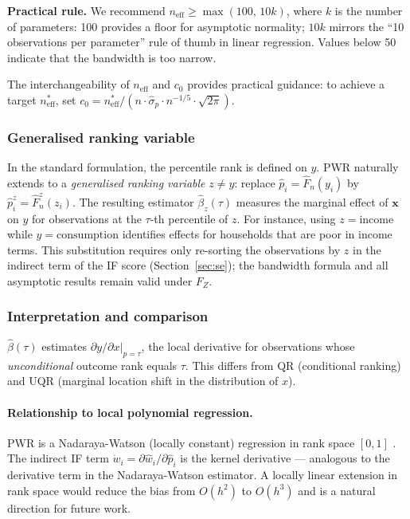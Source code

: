 \documentclass[12pt,a4paper]{article}
\theoremstyle{definition}
\newcommand{\bx}{\mathbf{x}}
\newcommand{\hbeta}{\hat{\beta}}
\newcommand{\hw}{\hat{w}}
\newcommand{\hF}{\hat{F}}
\begin{document}
\textbf{Practical rule.} We recommend $n_{\mathrm{eff}} \geq
\max(100,\,10k)$, where $k$ is the number of parameters: 100 provides a
floor for asymptotic normality; $10k$ mirrors the ``10 observations per
parameter'' rule of thumb in linear regression. Values below 50 indicate
that the bandwidth is too narrow.

The interchangeability of $n_{\mathrm{eff}}$ and $c_0$ provides
practical guidance: to achieve a target $n_{\mathrm{eff}}^*$, set
$c_0 = n_{\mathrm{eff}}^* / (n\cdot\hat\sigma_p\cdot n^{-1/5}
\cdot\sqrt{2\pi})$.

\subsubsection{Generalised ranking variable}
\label{sec:rankvar}

In the standard formulation, the percentile rank is defined on $y$.
PWR naturally extends to a \emph{generalised ranking variable} $z
\neq y$: replace $\hat{p}_i = \hF_n(y_i)$ by
$\hat{p}_i^z = \hF_n^z(z_i)$. The resulting estimator
$\hbeta_z(\tau)$ measures the marginal effect of $\bx$ on $y$ for
observations at the $\tau$-th percentile of $z$. For instance, using
$z = \text{income}$ while $y = \text{consumption}$ identifies effects
for households that are poor in income terms. This substitution requires
only re-sorting the observations by $z$ in the indirect term of the IF
score (Section~\ref{sec:se}); the bandwidth formula and all asymptotic
results remain valid under $F_Z$.

\subsubsection{Interpretation and comparison}

$\hbeta(\tau)$ estimates $\partial y/\partial x\big|_{p=\tau}$, the
local derivative for observations whose \textit{unconditional} outcome
rank equals $\tau$. This differs from QR (conditional ranking) and UQR
(marginal location shift in the distribution of $x$).

\paragraph{Relationship to local polynomial regression.}
PWR is a Nadaraya-Watson (locally constant) regression in rank space
$[0,1]$ \citep{FanGijbels1996,Chaudhuri1991}. The indirect IF term
$\dot{w}_i = \partial\hw_i/\partial\hat{p}_i$ is the kernel derivative ---
analogous to the derivative term in the Nadaraya-Watson estimator.
A locally linear extension in rank space would reduce the bias from
$O(h^2)$ to $O(h^3)$ and is a natural direction for future work.
\end{document}
